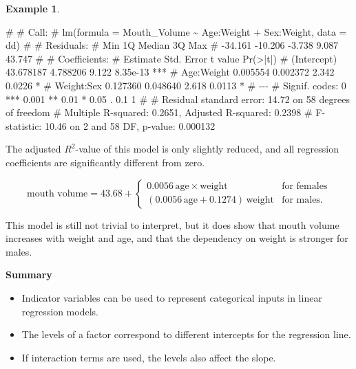 \documentclass[
  a4paper,
]{article}
\newenvironment{Shaded}{\begin{snugshade}}{\end{snugshade}}
\newcommand{\NormalTok}[1]{#1}
\providecommand{\tightlist}{%
  \setlength{\itemsep}{0pt}\setlength{\parskip}{0pt}}
\theoremstyle{definition}
\theoremstyle{definition}
\newtheorem{example}{Example}[section]
\theoremstyle{definition}
\theoremstyle{definition}
\theoremstyle{remark}
\begin{document}
\begin{example}
\begin{Shaded}
\begin{Highlighting}[]
\NormalTok{\# }
\NormalTok{\# Call:}
\NormalTok{\# lm(formula = Mouth\_Volume \textasciitilde{} Age:Weight + Sex:Weight, data = dd)}
\NormalTok{\# }
\NormalTok{\# Residuals:}
\NormalTok{\#     Min      1Q  Median      3Q     Max }
\NormalTok{\# {-}34.161 {-}10.206  {-}3.738   9.087  43.747 }
\NormalTok{\# }
\NormalTok{\# Coefficients:}
\NormalTok{\#              Estimate Std. Error t value Pr(\textgreater{}|t|)    }
\NormalTok{\# (Intercept) 43.678187   4.788206   9.122 8.35e{-}13 ***}
\NormalTok{\# Age:Weight   0.005554   0.002372   2.342   0.0226 *  }
\NormalTok{\# Weight:Sex   0.127360   0.048640   2.618   0.0113 *  }
\NormalTok{\# {-}{-}{-}}
\NormalTok{\# Signif. codes:  0 \textquotesingle{}***\textquotesingle{} 0.001 \textquotesingle{}**\textquotesingle{} 0.01 \textquotesingle{}*\textquotesingle{} 0.05 \textquotesingle{}.\textquotesingle{} 0.1 \textquotesingle{} \textquotesingle{} 1}
\NormalTok{\# }
\NormalTok{\# Residual standard error: 14.72 on 58 degrees of freedom}
\NormalTok{\# Multiple R{-}squared:  0.2651,  Adjusted R{-}squared:  0.2398 }
\NormalTok{\# F{-}statistic: 10.46 on 2 and 58 DF,  p{-}value: 0.000132}
\end{Highlighting}
\end{Shaded}

The adjusted \(R^2\)-value of this model is only slightly reduced,
and all regression coefficients are significantly
different from zero.

\begin{equation*}
  \textrm{mouth volume}
  = 43.68
    + \begin{cases}
      0.0056 \, \mathrm{age} \times \mathrm{weight}
          & \mbox{for females} \\
      (0.0056 \, \mathrm{age} + 0.1274) \, \mathrm{weight}
          & \mbox{for males.}
  \end{cases}
\end{equation*}

This model is still not trivial to interpret, but it does show
that mouth volume increases with weight and age, and that the
dependency on weight is stronger for males.
\end{example}

\textbf{Summary}

\begin{itemize}
\tightlist
\item
  Indicator variables can be used to represent categorical inputs
  in linear regression models.
\item
  The levels of a factor correspond to different intercepts for
  the regression line.
\item
  If interaction terms are used, the levels also affect the slope.
\end{itemize}
\end{document}
